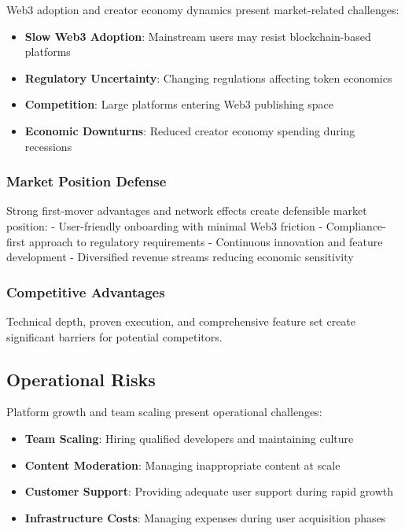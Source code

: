 Web3 adoption and creator economy dynamics present market-related challenges:

\begin{itemize}
    \item \textbf{Slow Web3 Adoption}: Mainstream users may resist blockchain-based platforms
    \item \textbf{Regulatory Uncertainty}: Changing regulations affecting token economics
    \item \textbf{Competition}: Large platforms entering Web3 publishing space
    \item \textbf{Economic Downturns}: Reduced creator economy spending during recessions
\end{itemize}

\subsubsection{Market Position Defense}

Strong first-mover advantages and network effects create defensible market position:
- User-friendly onboarding with minimal Web3 friction
- Compliance-first approach to regulatory requirements
- Continuous innovation and feature development
- Diversified revenue streams reducing economic sensitivity

\subsubsection{Competitive Advantages}

Technical depth, proven execution, and comprehensive feature set create significant barriers for potential competitors.

\subsection{Operational Risks}

Platform growth and team scaling present operational challenges:

\begin{itemize}
    \item \textbf{Team Scaling}: Hiring qualified developers and maintaining culture
    \item \textbf{Content Moderation}: Managing inappropriate content at scale
    \item \textbf{Customer Support}: Providing adequate user support during rapid growth
    \item \textbf{Infrastructure Costs}: Managing expenses during user acquisition phases
\end{itemize}

